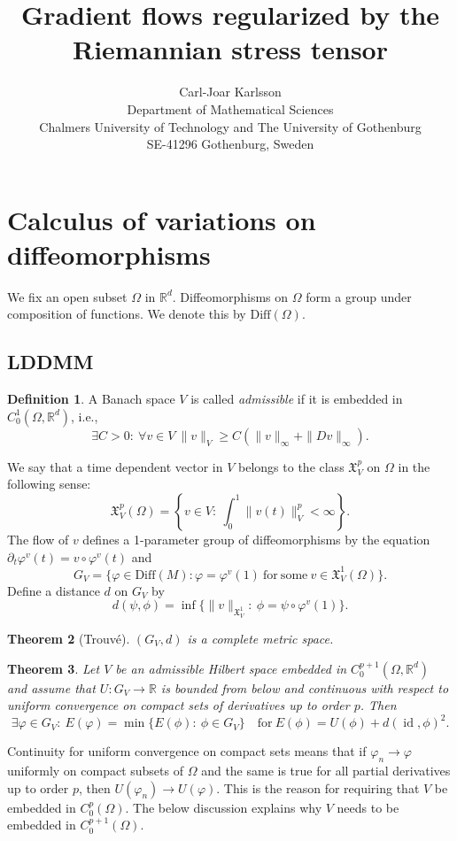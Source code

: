 \documentclass[a5paper,11pt,twoside]{article}
\title{Gradient flows regularized by the Riemannian stress tensor}
\author{Carl-Joar Karlsson  \\ 
	\small Department of Mathematical Sciences \\
	\small Chalmers University of Technology and The University of Gothenburg\\
	\small SE-41296 Gothenburg, Sweden}
\theoremstyle{plain}
\newtheorem{teo}{Theorem}[section]
\newcommand{\R}{\ensuremath{\mathbb{R}}}
\newcommand{\X}{\ensuremath{\mathfrak{X}}}
\newcommand{\Diff}{\ensuremath{\mathrm{Diff}}}
\newcommand{\id}{\operatorname{id}}
\theoremstyle{definition}
\newtheorem{defin}[teo]{Definition}
\begin{document}
\maketitle
\thispagestyle{empty}

\section[Calculus of variations]{Calculus of variations on diffeomorphisms}
We fix an open subset $\Omega$ in $\R^d$. Diffeomorphisms on $\Omega$ form a group under composition of functions. We denote this by $\Diff(\Omega)$.

\subsection{LDDMM}

\begin{defin}
	A Banach space $V$ is called \textit{admissible} if it is embedded in $C_0^1(\Omega,\R^d)$, i.e., 
	\[
	\exists C>0: \ \forall v\in V\ \|v\|_V\geq C(\|v\|_\infty+\|Dv\|_\infty).
	\]
\end{defin}

We say that a time dependent vector in $V$ belongs to the class $\X_V^p$ on $\Omega$ in the following sense:
\[
\X_V^p(\Omega)=\left\{v\in V:\ \int_0^1\|v(t)\|_V^p<\infty\right\}.
\]
The flow of $v$ defines a 1-parameter group of diffeomorphisms by the equation $\partial_t\varphi^v(t)=v\circ\varphi^v(t)$ and 
\[
G_V=\{\varphi\in \Diff(M): \varphi=\varphi^v(1)\ \mathrm{for\ some\ } v\in\X_V^1(\Omega)\}.
\]
Define a distance $d$ on $G_V$ by
\[
d(\psi,\phi)=\inf\{\|v\|_{\X_V^1}:\ \phi=\psi\circ\varphi^v(1)\}.
\]

\begin{teo}[Trouvé]
$(G_V,d)$ is a complete metric space.
\end{teo}



\begin{teo}
Let $V$ be an admissible Hilbert space embedded in $C_0^{p+1}(\Omega,\R^d)$ and assume that $U:G_V\to\R$ is bounded from below and continuous with respect to uniform convergence on compact sets of derivatives up to order $p$. Then
\[
\exists \varphi\in G_V:\ E(\varphi)=\min\{E(\phi):\ \phi\in G_V\}\quad \mathrm{for\ } E(\phi)=U(\phi)+d(\id,\phi)^2.
\]
\end{teo}

Continuity for uniform convergence on compact sets means that if $\varphi_n\to\varphi$ uniformly on compact subsets of $\Omega$ and the same is true for all partial derivatives up to order $p$, then $U(\varphi_n)\to U(\varphi)$. This is the reason for requiring that $V$ be embedded in $C_0^p(\Omega)$. The below discussion explains why $V$ needs to be embedded in $C^{p+1}_0(\Omega)$.
\end{document}
